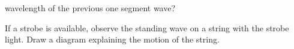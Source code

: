 wavelength of the previous one segment wave?




If a strobe is available, observe the standing wave on a string with the 
strobe light. Draw a diagram explaining the motion of the string.




